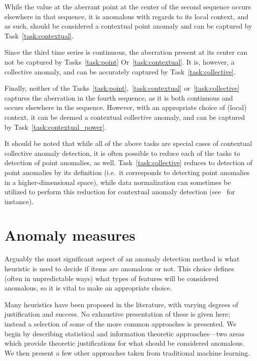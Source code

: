 While the value at the aberrant point at the center of the second sequence occurs elsewhere in that sequence, it is anomalous with regards to its local context, and as such, should be considered a contextual point anomaly and can be captured by Task~\ref{task:contextual}.

Since the third time series is continuous, the aberration present at its center can not be captured by Tasks~\ref{task:point} Or~\ref{task:contextual}. It is, however, a collective anomaly, and can be accurately captured by Task~\ref{task:collective}.

Finally, neither of the Tasks~\ref{task:point},~\ref{task:contextual} or~\ref{task:collective} captures the aberration in the fourth sequence, as it is both continuous and occurs elsewhere in the sequence. However, with an appropriate choice of (local) context, it can be deemed a contextual collective anomaly, and can be captured by Task~\ref{task:contextual_power}.

It should be noted that while all of the above tasks are special cases of contextual collective anomaly detection, it is often possible to reduce each of the tasks to detection of point anomalies, as well. Task~\ref{task:collective} reduces to detection of point anomalies by its definition (i.e.\ it corresponds to detecting point anomalies in a higher-dimensional space), while data normalization can sometimes be utilized to perform this reduction for contextual anomaly detection (see~\cite{meckesheimer} for instance).

\section{Anomaly measures}
\label{sect:anomaly_measures}

Arguably the most significant aspect of an anomaly detection method is what heuristic is used to decide if items are anomalous or not. This choice defines (often in unpredictable ways) what types of features will be considered anomalous, so it is vital to make an appropriate choice.

Many heuristics have been proposed in the literature, with varying degrees of justification and success. No exhaustive presentation of these is given here; instead a selection of some of the more common approaches is presented. We begin by describing statistical and information theoretic approaches---two areas which provide theoretic justifications for what should be considered anomalous. We then present a few other approaches taken from traditional machine learning.

